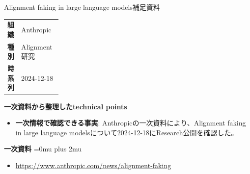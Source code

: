 \begin{technicalnote}{Alignment faking in large language models}{補足資料}
\begingroup
\begin{tabularx}{\linewidth}{@{}>{\bfseries}p{0.22\linewidth}X@{}}
組織 & Anthropic \\
種別 & Alignment研究 \\
時系列 & 2024-12-18 \\
\end{tabularx}
\smallskip
{\bfseries 一次資料から整理したtechnical points}
\begin{itemize}[leftmargin=1.5em,itemsep=0.35em]
\item \textbf{一次情報で確認できる事実}: Anthropicの一次資料により、Alignment faking in large language modelsについて2024-12-18にResearch公開を確認した。
\end{itemize}
\begin{minipage}{\linewidth}
\begin{samepage}
{\bfseries 一次資料}
\begingroup\sloppy
\Urlmuskip=0mu plus 2mu\relax
\begin{itemize}[leftmargin=1.5em,itemsep=0.25em]
\item {\scriptsize\url{https://www.anthropic.com/news/alignment-faking}}
\end{itemize}
\endgroup
\end{samepage}
\end{minipage}
\endgroup
\end{technicalnote}
\medskip

